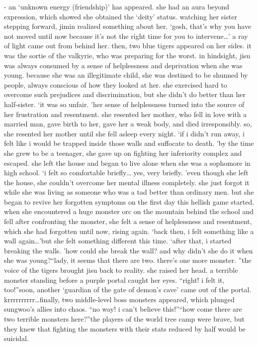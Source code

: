- an ‘unknown energy (friendship)’ has appeared.
she had an aura beyond expression, which showed she obtained the ‘deity’ status.
watching her sister stepping forward, jimin realized something about her.
‘gosh, that’s why you have not moved until now because it’s not the right time for you to intervene…’
a ray of light came out from behind her.
 then, two blue tigers appeared on her sides.
it was the sortie of the valkyrie, who was preparing for the worst.
in hindsight, jisu was always consumed by a sense of helplessness and deprivation when she was young.
 because she was an illegitimate child, she was destined to be shunned by people, always conscious of how they looked at her.
 she exercised hard to overcome such prejudices and discrimination, but she didn’t do better than her half-sister.
‘it was so unfair.
’her sense of helplessness turned into the source of her frustration and resentment.
 she resented her mother, who fell in love with a married man, gave birth to her, gave her a weak body, and died irresponsibly.
 so, she resented her mother until she fell asleep every night.
‘if i didn’t run away, i felt like i would be trapped inside those walls and suffocate to death.
’by the time she grew to be a teenager, she gave up on fighting her inferiority complex and escaped.
 she left the house and began to live alone when she was a sophomore in high school.
‘i felt so comfortable briefly… yes, very briefly.
’even though she left the house, she couldn’t overcome her mental illness completely.
 she just forgot it while she was living as someone who was a tad better than ordinary men.
but she began to revive her forgotten symptoms on the first day this hellish game started.
 when she encountered a huge monster orc on the mountain behind the school and fell after confronting the monster, she felt a sense of helplessness and resentment, which she had forgotten until now, rising again.
‘back then, i felt something like a wall again…’but she felt something different this time.
‘after that, i started breaking the walls.
’how could she break the wall? and why didn’t she do it when she was young?“lady, it seems that there are two.
 there’s one more monster.
”the voice of the tigers brought jisu back to reality.
 she raised her head.
 a terrible monster standing before a purple portal caught her eyes.
“right! i felt it, too!”soon, another ‘guardian of the gate of demon’s cave’ came out of the portal.
krrrrrrrrrr…finally, two middle-level boss monsters appeared, which plunged sungwoo’s allies into chaos.
“no way! i can’t believe this!”“how come there are two terrible monsters here?”the players of the world tree camp were brave, but they knew that fighting the monsters with their stats reduced by half would be suicidal.
